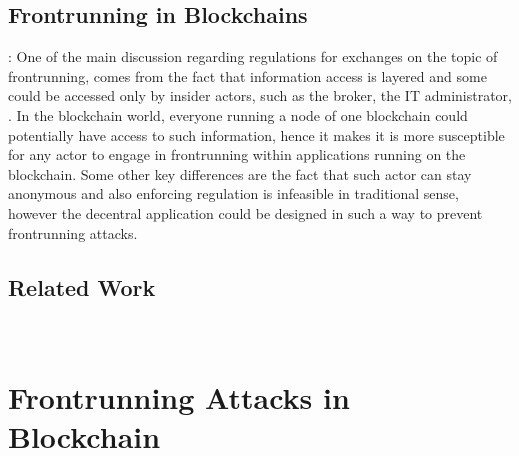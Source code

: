 \subsection{Frontrunning in Blockchains}: One of the main discussion regarding regulations for exchanges on the topic of frontrunning, comes from the fact that information access is layered and some could be accessed only by insider actors, such as the broker, the IT administrator, \etc. In the blockchain world, everyone running a node of one blockchain could potentially have access to such information, hence it makes it is more susceptible for any actor to engage in frontrunning within applications running on the blockchain. Some other key differences are the fact that such actor can stay anonymous and also enforcing regulation is infeasible in traditional sense, however the decentral application could be designed in such a way to prevent frontrunning attacks. 



\subsection{Related Work}

~\cite{malinova2017market}
~\cite{aune2017footprints}





















\section{Frontrunning Attacks in Blockchain}

